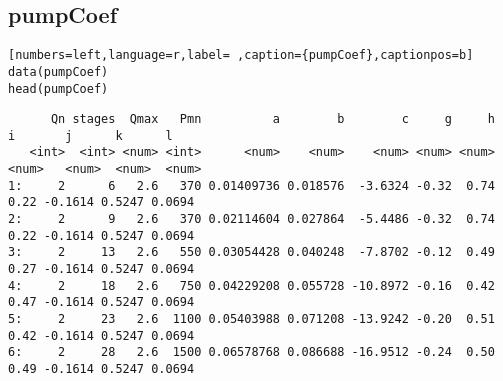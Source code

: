 \subsection{pumpCoef}
\label{sec:org1bf0b61}
\label{subsec:pumpcoef}
\begin{lstlisting}[numbers=left,language=r,label= ,caption={pumpCoef},captionpos=b]
data(pumpCoef)
head(pumpCoef)
\end{lstlisting}

\begin{verbatim}
      Qn stages  Qmax   Pmn          a        b        c     g     h     i       j      k      l
   <int>  <int> <num> <int>      <num>    <num>    <num> <num> <num> <num>   <num>  <num>  <num>
1:     2      6   2.6   370 0.01409736 0.018576  -3.6324 -0.32  0.74  0.22 -0.1614 0.5247 0.0694
2:     2      9   2.6   370 0.02114604 0.027864  -5.4486 -0.32  0.74  0.22 -0.1614 0.5247 0.0694
3:     2     13   2.6   550 0.03054428 0.040248  -7.8702 -0.12  0.49  0.27 -0.1614 0.5247 0.0694
4:     2     18   2.6   750 0.04229208 0.055728 -10.8972 -0.16  0.42  0.47 -0.1614 0.5247 0.0694
5:     2     23   2.6  1100 0.05403988 0.071208 -13.9242 -0.20  0.51  0.42 -0.1614 0.5247 0.0694
6:     2     28   2.6  1500 0.06578768 0.086688 -16.9512 -0.24  0.50  0.49 -0.1614 0.5247 0.0694
\end{verbatim}
